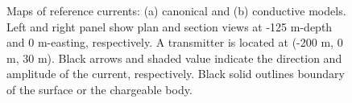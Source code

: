 \documentclass[extra,mreferee]{gji}
\begin{document}
\begin{figure}
  \caption{Maps of reference currents: (a) canonical and (b) conductive models. Left and right panel show plan and section views at -125 m-depth and 0 m-easting, respectively. A transmitter is located at (-200 m, 0 m, 30 m). Black arrows and shaded value indicate the direction and amplitude of the current, respectively. Black solid outlines boundary of the surface or the chargeable body.}
  \label{F:ReferenceCurrent}
\end{figure}
\end{document}

